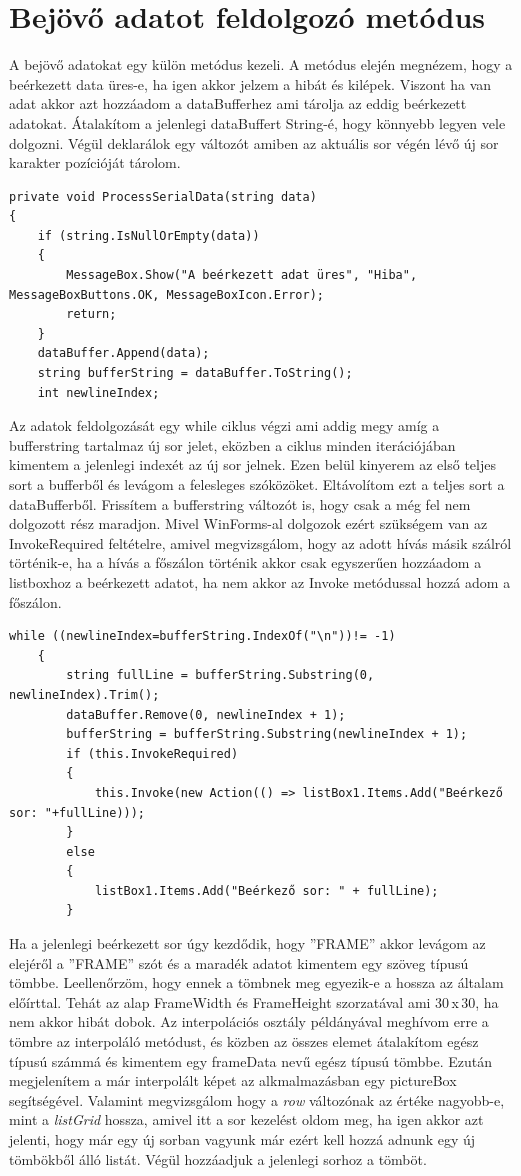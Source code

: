 \documentclass[]{thesis-ekf}
\theoremstyle{definition}
\theoremstyle{remark}
\begin{document}
\section{Bejövő adatot feldolgozó metódus}
A bejövő adatokat egy külön metódus kezeli. A metódus elején megnézem, hogy a beérkezett data üres-e, ha igen akkor jelzem a hibát és kilépek. Viszont ha van adat akkor azt hozzáadom a dataBufferhez ami tárolja az eddig beérkezett adatokat. Átalakítom a jelenlegi dataBuffert String-é, hogy könnyebb legyen vele dolgozni. Végül deklarálok egy változót amiben az aktuális sor végén lévő új sor karakter pozícióját tárolom.
\begin{lstlisting}[language=CSharp, basicstyle=\small]
private void ProcessSerialData(string data)
{
	if (string.IsNullOrEmpty(data))
	{
		MessageBox.Show("A beérkezett adat üres", "Hiba", MessageBoxButtons.OK, MessageBoxIcon.Error);
		return;
	}
	dataBuffer.Append(data); 
	string bufferString = dataBuffer.ToString();
	int newlineIndex;
\end{lstlisting}
Az adatok feldolgozását egy while ciklus végzi ami addig megy amíg a bufferstring tartalmaz új sor jelet, eközben a ciklus minden iterációjában kimentem a jelenlegi indexét az új sor jelnek. Ezen belül kinyerem az első teljes sort a bufferből és levágom a felesleges szóközöket. Eltávolítom ezt a teljes sort a dataBufferből. Frissítem a bufferstring változót is, hogy csak a még fel nem dolgozott rész maradjon. Mivel WinForms-al dolgozok ezért szükségem van az InvokeRequired feltételre, amivel megvizsgálom, hogy az adott hívás másik szálról történik-e, ha a hívás a főszálon történik akkor csak egyszerűen hozzáadom a listboxhoz a beérkezett adatot, ha nem akkor az Invoke metódussal hozzá adom a főszálon.
\begin{lstlisting}[language=CSharp]
	while ((newlineIndex=bufferString.IndexOf("\n"))!= -1)
	{
		string fullLine = bufferString.Substring(0, newlineIndex).Trim(); 
		dataBuffer.Remove(0, newlineIndex + 1);
		bufferString = bufferString.Substring(newlineIndex + 1);
		if (this.InvokeRequired)
		{
			this.Invoke(new Action(() => listBox1.Items.Add("Beérkező sor: "+fullLine)));
		}
		else
		{
			listBox1.Items.Add("Beérkező sor: " + fullLine);
		}
\end{lstlisting}
Ha a jelenlegi beérkezett sor úgy kezdődik, hogy ''FRAME'' akkor levágom az elejéről a ''FRAME'' szót és a maradék adatot kimentem egy szöveg típusú tömbbe. Leellenőrzöm, hogy ennek a tömbnek meg egyezik-e a hossza az általam előírttal. Tehát az alap FrameWidth és FrameHeight szorzatával ami 30\,x\,30, ha nem akkor hibát dobok. Az interpolációs osztály példányával meghívom erre a tömbre az interpoláló metódust, és közben az összes elemet átalakítom egész típusú számmá és kimentem egy frameData nevű egész típusú tömbbe. Ezután megjelenítem a már interpolált képet az alkmalmazásban egy pictureBox segítségével. Valamint megvizsgálom hogy a \emph{row} változónak az értéke nagyobb-e, mint a \emph{listGrid} hossza, amivel itt a sor kezelést oldom meg, ha igen akkor azt jelenti, hogy már egy új sorban vagyunk már ezért kell hozzá adnunk egy új tömbökből álló listát. Végül hozzáadjuk a jelenlegi sorhoz a tömböt. 
\end{document}
